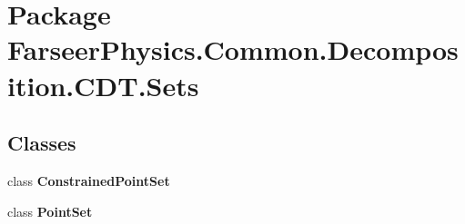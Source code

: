 \hypertarget{namespace_farseer_physics_1_1_common_1_1_decomposition_1_1_c_d_t_1_1_sets}{\section{Package Farseer\+Physics.\+Common.\+Decomposition.\+C\+D\+T.\+Sets}
\label{namespace_farseer_physics_1_1_common_1_1_decomposition_1_1_c_d_t_1_1_sets}
}
\subsection*{Classes}
\begin{DoxyCompactItemize}
\item 
class {\bfseries Constrained\+Point\+Set}
\item 
class {\bfseries Point\+Set}
\end{DoxyCompactItemize}
